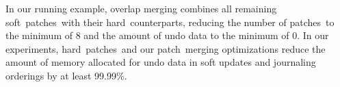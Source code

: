 \documentclass[9pt,twocolumn,letterpaper]{article}
\newcommand{\patch}{patch}
\newcommand{\patches}{patches}
\newcommand{\noop}{empty}
\newcommand{\nrb}{hard}
\newcommand{\rb}{soft}
\newcommand{\patchoptundo}{at least 99.99\%}
\newcommand{\todo}[1]{\footnote{\textbf{TODO}: #1}}
\begin{document}
\begin{comment}
, and to limit $p \PDDepend q$ existence checks to just $p$'s
and $q$'s two oldest and newest dependencies.
%
The rules to overlap merge two bit \patches\ are similar.
\end{comment}



In our running example, overlap merging combines all remaining
\rb\ \patches\ with their \nrb\ counterparts, reducing the number of \patches\
to the minimum of 8 and the amount of undo data to the minimum of 0.
%
In our experiments, \nrb\ \patches\ and our \patch\ merging
optimizations reduce the amount of memory allocated for undo data in
soft updates and journaling orderings by \patchoptundo.


\begin{comment}
%
If the only dependency between $p_1$ and $p_2$ is direct---that is, no path
$p_1 \PDepend x \PDepend p_2$ exists for any $x \not\in \{p_1,
p_2\}$---then it will always be possible to write $p_1$ and $p_2$ at the
same time.
%
Specifically, it is possible to write $p_1$ 


Many of these and similar \patches\ are mergeable and have
dependencies that allow simple (and fast) reasoning to identify many
of the mergeable pairs: two \patches\ on block $b$ that overlap no other \patches\ in \PMem[b]
and which have no dependency path from the new to the existing \patch\
will not induce a block-level cycle and so are writable together.
We know that \textit{later} changes will not cause them to induce a block-level cycle due to
invariant~\ref{cdinvar:add-before} and by not merging if the new \patch\
has a before and the before is marked as allowed to violate
invariant~\ref{cdinvar:add-before}.
%
While path existence testing is expensive, a conservative path test
of only a depth of two identifies most mergeable \patches. If the new
\patch\ has an explicit \before\ that is not the existing \patch\ and
this \before\ has a \before, then there may be a path to the existing
\patch.
%
To merge two such overlapping \patches, add the new \patch's explicit
before to the existing \patch\ (if any and if not the existing \patch).



At the end of \patch\ optimizations, say something along the lines:
%
The dynamic optimizations facilitated through \nrb\
\patches\ implement the efficiency in systems using soft updates or
journaling\todo{Actually do this for journaling} while expressing
changes modularly through structural descriptions rather than through
internal and semantic file system descriptions.

\todo{Should we talk about why we allow NRBs and merging to be
  disabled? (Debugging simplicity and depend add to \noop\ \patches\
  with \afters\ bug catching.)}
\end{comment}
\end{document}
